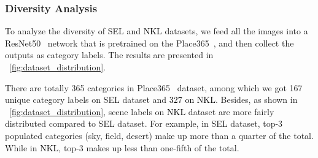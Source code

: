 \documentclass[10pt,journal,cspaper,compsoc]{IEEEtran}
\newcommand{\revise}[1]{{\textcolor{black}{#1}}}
\newcommand{\CheckRmv}[1]{}
\newcommand{\CheckRmv}[1]{#1}
\begin{document}
\CheckRmv{
\begin{figure}[!htb]
  \centering
  \begin{overpic}[width=1\linewidth]{figures/line_numbers.pdf}
    \put(15, 26){\rotatebox{30}{\scriptsize 33.0\%}}
    \put(19, 41){\rotatebox{30}{\scriptsize 54.5\%}}
    
    \put(26, 31){\rotatebox{29}{\scriptsize 40.2\%}}
    \put(30, 25.5){\rotatebox{30}{\scriptsize 31.5\%}}

    \put(37, 17.3){\rotatebox{30}{\scriptsize 19.4\%}}
    \put(40, 11.5){\rotatebox{30}{\scriptsize 11.3\%}}

    \put(47, 8.6){\rotatebox{30}{\scriptsize 6.7\%}}
    \put(51, 5){\rotatebox{30}{\scriptsize 2.1\%}}

    \put(58.5, 5.5){\rotatebox{30}{\scriptsize 0.54\%}}
    \put(62.2, 4.5){\rotatebox{30}{\scriptsize 0.41\%}}

    \put(69, 4.8){\rotatebox{30}{\scriptsize 0.01\%}}
    \put(73, 4.2){\rotatebox{30}{\scriptsize 0.01\%}}

    \put(80, 5){\rotatebox{30}{\scriptsize 0.01\%}}
    \put(83, 4){\rotatebox{30}{\scriptsize 0}}

    \put(90.5, 5){\rotatebox{30}{\scriptsize 0.003\%}}
    \put(93.5, 4){\rotatebox{30}{\scriptsize 0}}

    \put(78, 39.6){\scriptsize NKL (Ours)}
    \put(78, 34.4){\scriptsize SEL~\cite{lee2017semantic}}
  \end{overpic}
  \caption{
    \revise{Histogram chart of number of lines.
    Lines of our dataset are more fairly distributed compared to
    SEL.}
  }
  \label{fig:number_statistics}
\end{figure}
}

\subsubsection{Diversity Analysis}
To analyze the diversity of SEL and \revise{NKL} datasets,
we feed all the images into a ResNet50~\cite{he2016deep} network that is pretrained on the Place365~\cite{zhou2017places},
and then collect the outputs as category labels.
%
The results are presented in ~\cref{fig:dataset_distribution}.

There are totally 365 categories in Place365~\cite{zhou2017places} dataset,
among which we got 167 unique category labels on SEL dataset and \revise{327 on NKL}.
%
Besides, as shown in ~\cref{fig:dataset_distribution}, scene labels on
\revise{NKL} dataset are more fairly distributed compared to SEL dataset.
%
For example, in SEL dataset, top-3 populated categories (sky, field, desert) make up more
than a quarter of the total.
%
While in \revise{NKL}, top-3 makes up less than one-fifth of the total.
\end{document}
